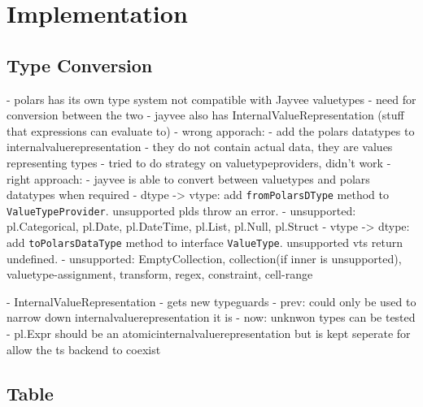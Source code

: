 \chapter{Implementation}
\label{chapter:Implementation}

\section{Type Conversion}
- polars has its own type system not compatible with Jayvee valuetypes
- need for conversion between the two
- jayvee also has InternalValueRepresentation (stuff that expressions can evaluate to)
- wrong apporach:
- add the polars datatypes to internalvaluerepresentation
- they do not contain actual data, they are values representing types
- tried to do strategy on valuetypeproviders, didn't work
- right approach:
- jayvee is able to convert between valuetypes and polars datatypes when required
- dtype -> vtype: add \Verb|fromPolarsDType| method to \Verb|ValueTypeProvider|. unsupported plds throw an error.
- unsupported: pl.Categorical, pl.Date, pl.DateTime, pl.List, pl.Null, pl.Struct
- vtype -> dtype: add \Verb|toPolarsDataType| method to interface \Verb|ValueType|. unsupported vts return undefined.
- unsupported: EmptyCollection, collection(if inner is unsupported), valuetype-assignment, transform, regex, constraint, cell-range

- InternalValueRepresentation
- gets new typeguards
- prev: could only be used to narrow down internalvaluerepresentation it is
- now: unknwon types can be tested
- pl.Expr should be an atomicinternalvaluerepresentation but is kept seperate for allow the ts backend to coexist


\section{Table}
